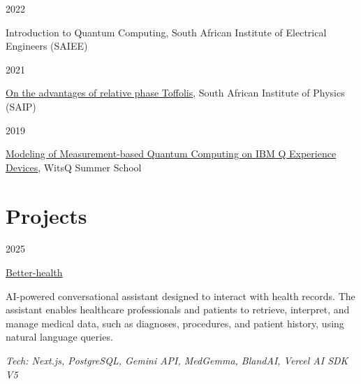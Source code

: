 \documentclass[9pt]{extreport}
\newcommand{\listitemspace}{0.25em}
\renewenvironment{itemize}
{\begin{list}{}{
    \setlength{\leftmargin}{0em}
    \setlength{\parskip}{0em}
    \setlength{\itemsep}{\listitemspace}
    \setlength{\parsep}{\listitemspace}}}
{\end{list}}
\newcommand{\entry}[2]{%
  \noindent%
  \begin{minipage}[t]{2.25cm}%
    \raggedright #1%
  \end{minipage}%
  \hspace{0.4cm}%
  \begin{minipage}[t]{\dimexpr\textwidth-2cm\relax}%
    #2%
  \end{minipage}%
  \vspace{0.25cm}%
}
\begin{document}
\entry{2022}{{Introduction to Quantum Computing}, South African Institute of Electrical Engineers (SAIEE)}

\entry{2021}{\href{https://github.com/Unathi-Skosana/posters-n-presentations/blob/main/posters/saip-2021/release/poster.pdf}{{On the advantages of relative phase Toffolis}}, South African Institute of Physics (SAIP)}

\entry{2019}{\href{https://github.com/Unathi-Skosana/posters-n-presentations/blob/main/posters/witsq-summer-school-2019/release/poster.pdf}{Modeling of Measurement-based Quantum Computing on IBM Q Experience Devices}, WitsQ Summer School}






\section*{Projects}

\entry{2025}{\href{https://github.com/Unathi-Skosana/team-better-health}{Better-health}
\begin{itemize}
  \item AI-powered conversational assistant designed to interact with health records. The assistant enables healthcare professionals and patients to retrieve, interpret, and manage medical data, such as diagnoses, procedures, and patient history, using natural language queries. 
  \item \textit{Tech: Next.js, PostgreSQL, Gemini API, MedGemma, BlandAI, Vercel AI SDK V5}
\end{itemize}}
\end{document}
